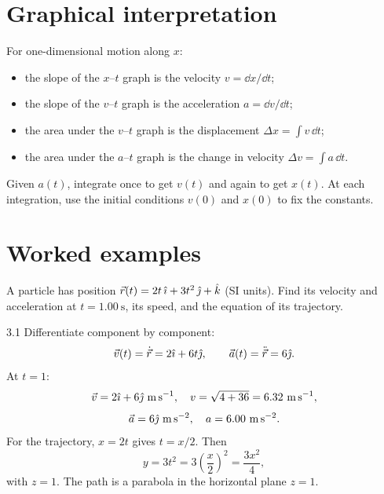 \section{Graphical interpretation}

For one-dimensional motion along $x$:
\begin{itemize}[leftmargin=1.4em,itemsep=3pt]
  \item the slope of the $x$--$t$ graph is the velocity $v=\dd x/\dd t$;
  \item the slope of the $v$--$t$ graph is the acceleration $a=\dd v/\dd t$;
  \item the area under the $v$--$t$ graph is the displacement
        $\Delta x=\int v\,\dd t$;
  \item the area under the $a$--$t$ graph is the change in velocity
        $\Delta v=\int a\,\dd t$.
\end{itemize}

\begin{method}
Given $a(t)$, integrate once to get $v(t)$ and again to get $x(t)$. At each
integration, use the initial conditions $v(0)$ and $x(0)$ to fix the constants.
\end{method}

\section{Worked examples}

\begin{worked}
A particle has position
$\vec r(t)=2t\,\hat{\imath}+3t^2\,\hat{\jmath}+\hat{k}$ (SI units). Find its velocity and
acceleration at $t=1.00\ \mathrm{s}$, its speed, and the equation of its
trajectory.
\end{worked}

\begin{solution}{3.1}
Differentiate component by component:
\[
\vec v(t)=\dot{\vec r}=2\hat{\imath}+6t\hat{\jmath},\qquad
\vec a(t)=\ddot{\vec r}=6\hat{\jmath}.
\]
At $t=1$:
\[
\vec v=2\ihat+6\jhat\ \mathrm{m\,s^{-1}},\quad
v=\sqrt{4+36}=6.32\ \mathrm{m\,s^{-1}},
\]
\[
\vec a=6\jhat\ \mathrm{m\,s^{-2}},\quad a=6.00\ \mathrm{m\,s^{-2}}.
\]
For the trajectory, $x=2t$ gives $t=x/2$. Then
\[
y=3t^2=3\left(\frac x2\right)^2=\frac{3x^2}{4},
\]
with $z=1$. The path is a parabola in the horizontal plane $z=1$.
\end{solution}

